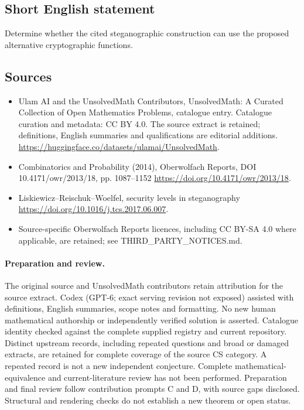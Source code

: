 \documentclass[11pt]{article}
\begin{document}
\subsection{Short English statement}
Determine whether the cited steganographic construction can use the proposed alternative cryptographic functions.
\subsection{Sources}
\begin{itemize}
\item[\hypertarget{source:statement:1}{S1}] Ulam AI and the UnsolvedMath Contributors, UnsolvedMath: A Curated Collection of Open Mathematics Problems, catalogue entry. Catalogue curation and metadata: CC BY 4.0. The source extract is retained; definitions, English summaries and qualifications are editorial additions.
\url{https://huggingface.co/datasets/ulamai/UnsolvedMath}.
\item[\hypertarget{source:statement:2}{S2}] Combinatorics and Probability (2014), Oberwolfach Reports, DOI 10.4171/owr/2013/18, pp. 1087--1152
\url{https://doi.org/10.4171/owr/2013/18}.
\item[\hypertarget{source:statement:3}{S3}] Liskiewicz--Reischuk--Woelfel, security levels in steganography
\url{https://doi.org/10.1016/j.tcs.2017.06.007}.
\item Source-specific Oberwolfach Reports licences, including CC BY-SA 4.0 where applicable, are retained; see THIRD\_PARTY\_NOTICES.md.
\end{itemize}
\paragraph{Preparation and review.}
The original source and UnsolvedMath contributors retain attribution for the source extract. Codex (GPT-6; exact serving revision not exposed) assisted with definitions, English summaries, scope notes and formatting. No new human mathematical authorship or independently verified solution is asserted. Catalogue identity checked against the complete supplied registry and current repository. Distinct upstream records, including repeated questions and broad or damaged extracts, are retained for complete coverage of the source CS category. A repeated record is not a new independent conjecture. Complete mathematical-equivalence and current-literature review has not been performed. Preparation and final review follow contribution prompts C and D, with source gaps disclosed. Structural and rendering checks do not establish a new theorem or open status.
\label{end:statement}
\end{document}
